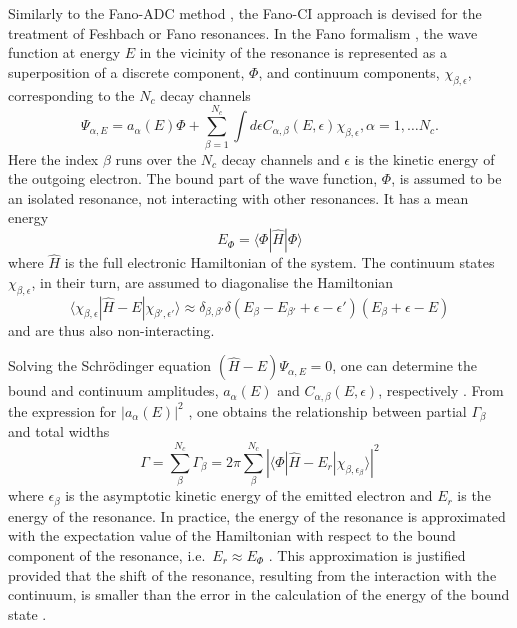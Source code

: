 \documentclass[a4paper, 10 pt]{report}
\newcommand{\dirint}[3]{\ensuremath{\langle #1|#2|#3\rangle}}
\begin{document}
Similarly to the Fano-ADC method \cite{Averbukh05:204107}, the Fano-CI approach 
is devised for the treatment of Feshbach or Fano resonances. In the Fano 
formalism \cite{Fano61:1866,Howat78:1575}, the wave function at energy $E$ in 
the vicinity of the resonance is represented as a superposition of a discrete 
component, $\Phi$, and continuum components, $\chi_{\beta, \epsilon}$, 
corresponding to the $N_{c}$ decay channels
%
\begin{equation}\label{eq:psi_fano}
\Psi_{\alpha, E} = a_{\alpha}(E) \Phi + \sum_{\beta = 1}^{N_{c}}\int d\epsilon C_{\alpha,\beta} (E,\epsilon) \chi_{\beta, \epsilon}, \alpha = 1, \dots N_{c}.
\end{equation}
%
Here the index $\beta$ runs over the $N_{c}$ decay channels and $\epsilon$ is 
the kinetic energy of the outgoing electron. The bound part of the wave 
function, $\Phi$, is assumed to be an isolated resonance, not interacting with 
other resonances. It has a mean energy
%
\begin{equation}\label{eq:E_phi}
E_{\Phi} = \langle\Phi | \hat{H} | \Phi\rangle
\end{equation}
%
where $\hat{H}$ is the full electronic Hamiltonian of the system. The continuum 
states $\chi_{\beta, \epsilon}$, in their turn, are assumed to diagonalise the 
Hamiltonian
%
\begin{equation}\label{eq:chi_orthog}
\langle\chi_{\beta,\epsilon} | \hat{H} - E | \chi_{\beta', \epsilon'} \rangle \approx \delta_{\beta, \beta'} \delta(E_{\beta} - E_{\beta'} + \epsilon - \epsilon') (E_{\beta} + \epsilon - E)
\end{equation}
%
and are thus also non-interacting.


Solving the Schr\"{o}dinger equation $(\hat{H} - E)\Psi_{\alpha, E} = 0$, one 
can determine the bound and continuum amplitudes, $a_{\alpha} (E)$ and 
$C_{\alpha, \beta} (E, \epsilon)$, respectively \cite{Fano61:1866,Howat78:1575}. From 
the expression for $|a_{\alpha}(E)|^2$ \cite{Howat78:1575}, one obtains the 
relationship between partial $\Gamma_{\beta}$ and total widths
%
\begin{equation}\label{eq:gamma_tot}
\Gamma = \sum_{\beta}^{N_{c}} \Gamma_{\beta} 
= 2\pi \sum_{\beta}^{N_{c}} |\dirint{\Phi}{\hat{H} - E_{r}}{\chi_{\beta, \epsilon_{\beta}}}|^{2}
\end{equation}
%
where $\epsilon_{\beta}$ is the asymptotic kinetic energy of the emitted 
electron and $E_{r}$ is the energy of the resonance. In practice, the energy of 
the resonance is approximated with the expectation value of the Hamiltonian with 
respect to the bound component of the resonance, i.e.~$E_{r} \approx E_{\Phi}$
\cite{Averbukh05:204107}. This approximation is justified provided that the 
shift of the resonance, resulting from the interaction with the continuum, is 
smaller than the error in the calculation of the energy of the bound state 
\cite{Averbukh05:204107}.
\end{document}
